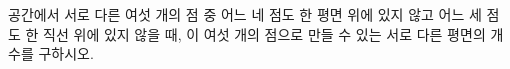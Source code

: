 공간에서 서로 다른 여섯 개의 점 중 어느 네 점도 한 평면 위에 있지 않고 어느 세 점도 한 직선 위에 있지 않을 때, 이 여섯 개의 점으로 만들 수 있는 서로 다른 평면의 개수를 구하시오.
